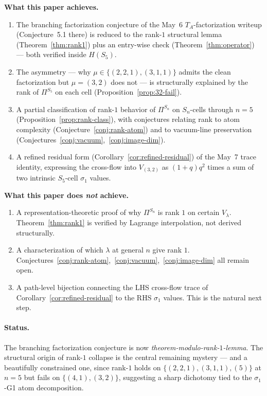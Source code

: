 \documentclass[11pt]{article}
\theoremstyle{definition}
\begin{document}
\textbf{What this paper achieves.}
\begin{enumerate}[leftmargin=2em,topsep=0.3em,itemsep=0.2em]
\item The branching factorization conjecture of the May~6 $T_A$-factorization writeup (Conjecture~5.1 there) is reduced to the rank-$1$ structural lemma (Theorem~\ref{thm:rank1}) plus an entry-wise check (Theorem~\ref{thm:operator}) — both verified inside $H(S_5)$.
\item The asymmetry — why $\mu \in \{(2,2,1), (3,1,1)\}$ admits the clean factorization but $\mu = (3,2)$ does not — is structurally explained by the rank of $\Pi^{S_5}$ on each cell (Proposition~\ref{prop:32-fail}).
\item A partial classification of rank-$1$ behavior of $\Pi^{S_n}$ on $S_n$-cells through $n = 5$ (Proposition~\ref{prop:rank-class}), with conjectures relating rank to atom complexity (Conjecture~\ref{conj:rank-atom}) and to vacuum-line preservation (Conjectures~\ref{conj:vacuum},~\ref{conj:image-dim}).
\item A refined residual form (Corollary~\ref{cor:refined-residual}) of the May~7 trace identity, expressing the cross-flow into $V_{(3,2)}$ as $(1+q)q^2$ times a sum of two intrinsic $S_5$-cell $\sigma_1$ values.
\end{enumerate}

\textbf{What this paper does \emph{not} achieve.}
\begin{enumerate}[leftmargin=2em,topsep=0.3em,itemsep=0.2em]
\item A representation-theoretic proof of why $\Pi^{S_n}$ is rank $1$ on certain $V_\lambda$. Theorem~\ref{thm:rank1} is verified by Lagrange interpolation, not derived structurally.
\item A characterization of which $\lambda$ at general $n$ give rank $1$. Conjectures~\ref{conj:rank-atom},~\ref{conj:vacuum},~\ref{conj:image-dim} all remain open.
\item A path-level bijection connecting the LHS cross-flow trace of Corollary~\ref{cor:refined-residual} to the RHS $\sigma_1$ values. This is the natural next step.
\end{enumerate}

\paragraph{Status.} The branching factorization conjecture is now \emph{theorem-modulo-rank-$1$-lemma}. The structural origin of rank-$1$ collapse is the central remaining mystery — and a beautifully constrained one, since rank-$1$ holds on $\{(2,2,1), (3,1,1), (5)\}$ at $n=5$ but fails on $\{(4,1), (3,2)\}$, suggesting a sharp dichotomy tied to the $\sigma_1$-G1 atom decomposition.
\end{document}
